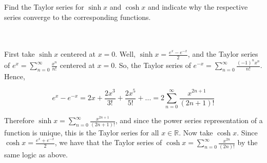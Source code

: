 Find the Taylor series for $\sinh x$ and $\cosh x$ and indicate why the respective series converge to
the corresponding functions.\\\\

\begin{solution}\renewcommand{\qedsymbol}{}\ \\
    First take $\sinh x$ centered at $x=0$. Well, $\sinh x=\frac{e^x-e^{-x}}{2}$, and the Taylor series
    of $e^x=\sum_{n=0}^{\infty}\frac{x^n}{n!}$ centered at $x=0$. So, the Taylor series of
    $e^{-x}=\sum_{n=0}^{\infty}\frac{(-1)^nx^n}{n!}$. Hence,
    
    $$e^x-e^{-x}=2x+\frac{2x^3}{3!}+\frac{2x^5}{5!}+...=2\sum_{n=0}^{\infty}\frac{x^{2n+1}}{(2n+1)!}$$
    
    Therefore $\sinh x=\sum_{n=0}^{\infty}\frac{x^{2n+1}}{(2n+1)!}$, and since the power series
    representation of a function is unique, this is the Taylor series for all $x\in\mathbb{R}$. Now take
    $\cosh x$. Since $\cosh x=\frac{e^x+e^{-x}}{2}$, we have that the Taylor series of
    $\cosh x=\sum_{n=0}^{\infty}\frac{x^{2n}}{(2n)!}$ by the same logic as above.

\end{solution}